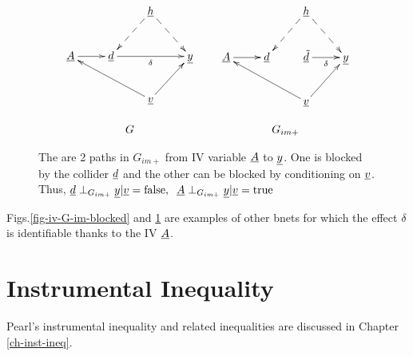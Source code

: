 \begin{figure}[h!]
$$
\begin{array}{ccc}
\xymatrix{
&&\rvh\ar@{-->}[dl]\ar@{-->}[dr]
\\
\rvA\ar[r]
&\rvd\ar[rr]_\delta
&&\rvy
\\
&&\rvv\ar[ur]\ar[ull]
}
&&
\xymatrix{
&&\rvh\ar@{-->}[dl]\ar@{-->}[dr]
\\
\rvA\ar[r]
&\rvd
&
\rvtd\ar[r]_\delta
&\rvy
\\
&&\rvv\ar[ur]\ar[ull]
}
\\
\\
G&&G_{im+}
\end{array}
$$
\caption{
The are 2 paths in $G_{im+}$
from
IV variable ${\underline{A}}$
to ${\underline{y}}$. One is
blocked
by the collider ${\underline{d}}$
and the other
can be blocked by 
conditioning on ${\underline{v}}$. Thus,
$
{\underline{d}}\perp_{G_{im+}} {\underline{y}}|{\underline{v}} =\text{false}, 
\;\; {\underline{A}}\perp_{G_{im+}} {\underline{y}}|{\underline{v}}= \text{true}
$
}
\label{fig-iv-G-im-strata}
\end{figure}

Figs.\ref{fig-iv-G-im-blocked}
and \ref{fig-iv-G-im-strata}
are examples of 
other bnets 
for which the
effect $\delta$
is identifiable
thanks
to the
IV ${\underline{A}}$.


\section*{Instrumental Inequality}
Pearl's instrumental inequality
and related inequalities are discussed in
 Chapter
 \ref{ch-inst-ineq}.


